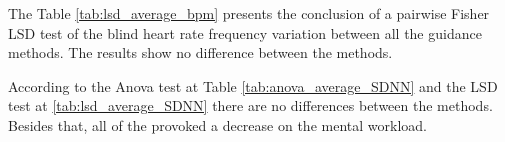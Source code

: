 

The Table \ref{tab:lsd_average_bpm} presents the conclusion of a pairwise Fisher LSD test of the blind heart rate frequency variation between all the guidance methods. The results show no difference between the methods.



%
%
%
%
%
%
%
%
%
%
%    
%
%

According to the Anova test at Table \ref{tab:anova_average_SDNN} and the LSD test at \ref{tab:lsd_average_SDNN} there are no differences between the methods. Besides that, all of the provoked a decrease on the mental workload.

\FloatBarrier